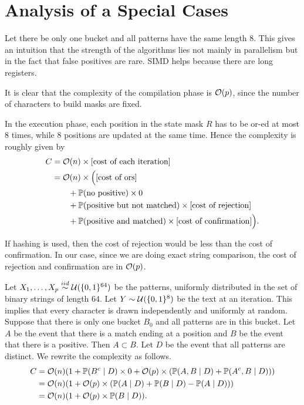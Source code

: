 \section{Analysis of a Special Cases}

Let there be only one bucket and all patterns have the same length $8$. This gives an intuition that the strength of the algorithms lies not mainly in parallelism but in the fact that false positives are rare. SIMD helps because there are long registers.

It is clear that the complexity of the compilation phase is $\mathcal{O}(p)$, since the number of characters to build masks are fixed.

In the execution phase, each position in the state mask $R$ has to be or-ed at most $8$ times, while $8$ positions are updated at the same time. Hence the complexity is roughly given by
\[
  \begin{aligned}
    C & = \mathcal{O}\!\left(n\right)\times [\text{cost of each iteration}]                           \\
      & = \mathcal{O}(n)\times\Big( [\text{cost of ors}]                                              \\
      & \qquad + \mathbb{P}(\text{no positive})\times 0                                             \\
      & \qquad + \mathbb{P}(\text{positive but not matched})\times[\text{cost of rejection}]        \\
      & \qquad + \mathbb{P}(\text{positive and matched})\times [\text{cost of confirmation}] \Big).
  \end{aligned}
\]

If hashing is used, then the cost of rejection would be less than the cost of confirmation. In our case, since we are doing exact string comparison, the cost of rejection and confirmation are in $\mathcal{O}(p)$.

Let $X_1,\ldots,X_p\overset{iid}{\sim}\mathcal{U}(\{0,1\}^{64})$ be the patterns, uniformly distributed in the set of binary strings of length $64$. Let $Y\sim \mathcal{U}(\{0,1\}^{8})$ be the text at an iteration. This implies that every character is drawn independently and uniformly at random. Suppose that there is only one bucket $B_0$ and all patterns are in this bucket. Let $A$ be the event that there is a match ending at a position and $B$ be the event that there is a positive. Then $A\subset B$. Let $D$ be the event that all patterns are distinct. We rewrite the complexity as follows.
\begin{align*}
  C & = \mathcal{O}(n)(1 + \mathbb{P}(B^c\mid D)\times 0 + \mathcal{O}(p)\times (\mathbb{P}(A,B\mid D) + \mathbb{P}(A^c,B\mid D))) \\
    & = \mathcal{O}(n)(1 + \mathcal{O}(p)\times (\mathbb{P}(A\mid D) + \mathbb{P}(B\mid D) - \mathbb{P}(A\mid D)))                 \\
    & = \mathcal{O}(n)(1 + \mathcal{O}(p)\times \mathbb{P}(B\mid D)).
\end{align*}

